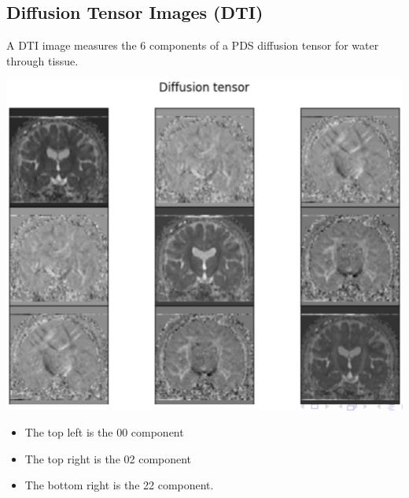 \documentclass[10pt]{article}
\begin{document}
\subsection*{Diffusion Tensor Images (DTI)}
A DTI image measures the 6 components of a PDS diffusion tensor for water through tissue.
\begin{center} 
	\includegraphics*[width=\textwidth]{W10_2.png} 
\end{center}
\begin{itemize}
	\item The top left is the 00 component
	\item The top right is the 02 component
	\item The bottom right is the 22 component.
\end{itemize}
\end{document}
